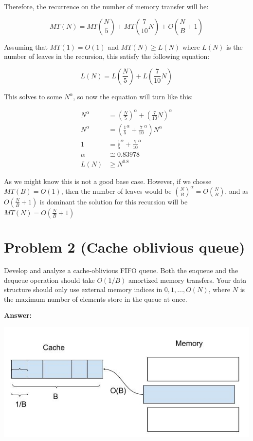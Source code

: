 \documentclass{article}
\begin{document}
\noindent Therefore, the recurrence on the number of memory transfer will be:

$$MT(N) = MT\left(\frac{N}{5}\right)+ MT \left(\frac{7}{10}N\right) + O\left(\frac{N}{B}+1\right)$$

\noindent Assuming that $MT(1)=O(1)$ and  $MT(N) \geq L(N)$ where $L(N)$ is the number of leaves in the recursion, this satisfy the following equation:

$$L(N) = L\left(\frac{N}{5}\right) + L\left(\frac{7}{10}N\right)$$

This solves to some $N^\alpha$, so now the equation will turn like this:

\begin{align*}
    N^\alpha &= \left(\frac{N}{5}\right)^\alpha + \left(\frac{7}{10} N\right)^\alpha \\
    N^\alpha &=\left( \frac{1}{5}^\alpha + \frac{7}{10}^\alpha\right)N^\alpha \\
    1 &=\frac{1}{5}^\alpha + \frac{7}{10}^\alpha \\
    \alpha & \cong 0.83978 \\
    L(N) &\geq N^{0.8}
\end{align*}


As we might know this is not a good base case. However, if we chosse $MT(B) =O(1)$, then the number of leaves would be $\left(\frac{N}{B}\right)^\alpha = O\left(\frac{N}{B}\right)$, and as $O\left(\frac{N}{B} +1\right)$ is dominant the solution for this recursion will be $MT(N) = O\left(\frac{N}{B} +1\right)$

\section*{Problem 2 (Cache oblivious queue)}

Develop and analyze a cache-oblivious FIFO queue.  Both the enqueue and the dequeue operation should take $O(1/B)$ amortized memory transfers.  Your data structure should only use external memory indices in $0,1,...,O(N)$, where $N$ is the maximum number of elements store in the queue at once.

\textbf{Answer:}

\includegraphics[scale = .5]{ej2.jpg}
\end{document}
